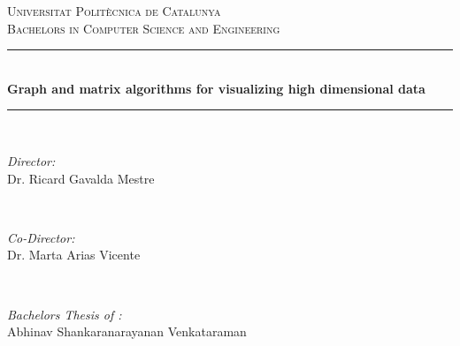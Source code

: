 \begin{titlepage}

\newcommand{\HRule}{\rule{\linewidth}{0.5mm}} %

\center %
 

\textsc{\LARGE Universitat Politècnica de Catalunya}\\[2.5cm] %
\textsc{\Large Bachelors in Computer Science and Engineering}\\[0.5cm] %


\HRule \\[0.4cm]
{ \huge \bfseries Graph and matrix algorithms for visualizing high dimensional data}\\[0.4cm] %
\HRule \\[1.5cm]
 

\begin{minipage}{0.4\textwidth}
\begin{flushleft} \large
\emph{Director:}\\
Dr. Ricard Gavalda Mestre 
\end{flushleft}
\end{minipage}
~
\begin{minipage}{0.4\textwidth}
\begin{flushright} \large
\emph{Co-Director:} \\
Dr. Marta Arias Vicente %
\end{flushright}
\end{minipage}\\[2cm]

\begin{minipage}{0.4\textwidth}
\begin{flushleft} \large
\emph{Bachelors Thesis of :}\\
Abhinav Shankaranarayanan Venkataraman
\end{flushleft}
\end{minipage}


\end{titlepage}
